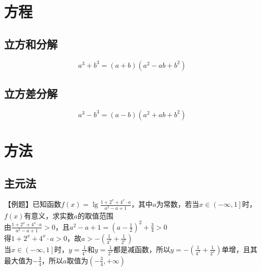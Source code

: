 \documentclass[UTF8]{ctexart}
\begin{document}
	\section{方程}
		\subsection{立方和分解}
			\[a^3+b^3=(a+b)(a^2-ab+b^2)\]
		\subsection{立方差分解}
			\[a^3-b^3=(a-b)(a^2+ab+b^2)\]
	\section{方法}
		\subsection{主元法}
			【例题】已知函数$f(x)=\lg \frac{1+2^x+4^x \cdot a}{a^2-a+1} $，其中$a$为常数，若当$x \in \left(-\infty ,1 \right] $时，$f(x)$有意义，求实数$a$的取值范围\\
			由$\frac{1+2^x+4^x \cdot a}{a^2-a+1}>0$，且$a^2-a+1=(a-\frac{1}{2})^2+\frac{3}{4}>0$\\
			得$1+2^x+4^x \cdot a>0$，故$a>-(\frac{1}{4^x}+\frac{1}{2^x})$\\
			当$x \in \left(-\infty ,1 \right] $时，$y=\frac{1}{4^x}$和$y=\frac{1}{2^x}$都是减函数，所以$y=-(\frac{1}{4^x}+\frac{1}{2^x})$单增，且其最大值为$-\frac{3}{4}$，所以$a$取值为$\left( -\frac{3}{4}, +\infty \right) $
\end{document}

